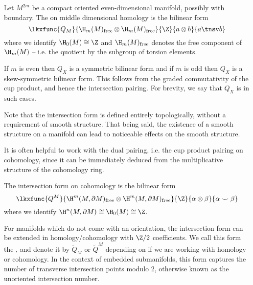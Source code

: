 \begin{definition}
	Let $M^{2m}$ be a compact oriented even-dimensional manifold, possibly with boundary. The  on middle dimensional homology is the bilinear form
	\begin{equation}
		\lkxfunc{Q_M}{\H_m(M)_{\mathrm{free}}\otimes \H_m(M)_{\mathrm{free}}}{\Z}{a\otimes b}{a \tnsv b}
	\end{equation}
	where we identify $\H_0(M)\cong \Z$ and $\H_m(M)_{\mathrm{free}}$ denotes the free component of $\H_m(M)$ -- i.e. the quotient by the subgroup of torsion elements.
\end{definition}

\begin{remark}
	If $m$ is even then $Q_X$ is a symmetric bilinear form and if $m$ is odd then $Q_X$ is a skew-symmetric bilinear form. This follows from the graded commutativity of the cup product, and hence the intersection pairing. For brevity, we say that $Q_X$ is  in such cases.
\end{remark}

\begin{remark}
	Note that the intersection form is defined entirely topologically, without a requirement of smooth structure. That being said, the existence of a smooth structure on a manifold can lead to noticeable effects on the smooth structure.
\end{remark}

It is often helpful to work with the dual pairing, i.e. the cup product pairing on cohomology, since it can be immediately deduced from the multiplicative structure of the cohomology ring.
\begin{definition}
	The intersection form on cohomology is the bilinear form
	\begin{equation}
		\lkxfunc{Q^M}{\H^m(M,\partial M)_{\mathrm{free}}\otimes \H^m(M,\partial M)_{\mathrm{free}}}{\Z}{\alpha\otimes \beta}{\alpha\smile \beta}
	\end{equation}
	where we identify $\H^n(M,\partial M)\cong \H_0(M)\cong \Z$.
\end{definition}

\begin{remark}
	For manifolds which do not come with an orientation, the intersection form can be extended in homology/cohomology with $\Z/2$ coefficients. We call this form the , and denote it by $\widetilde{Q}_M$ or $\widetilde{Q}^M$ depending on if we are working with homology or cohomology. In the context of embedded submanifolds, this form captures the number of transverse intersection points modulo 2, otherwise known as the unoriented intersection number.
\end{remark}

